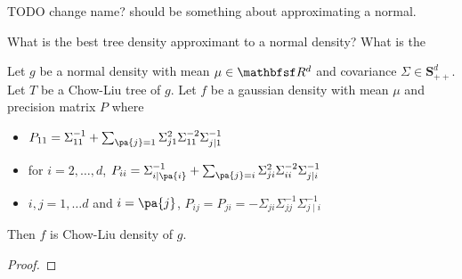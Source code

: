 
















\sstart
{}

TODO change name?
should be something about approximating a normal.

What is the best tree density approximant to a normal density?
What is the


\begin{prop}


Let $g$ be a normal density with mean $\mu \in \R^d$ and covariance $\Sigma \in \mathbf{S}^d_{++}$.
Let $T$ be a Chow-Liu tree of $g$.
Let $f$ be a gaussian density with mean $\mu$ and precision matrix $P$ where
  \begin{itemize}
    \item $P_{11} = \Sigma_{11}^{-1} + \sum_{\pa{j} = 1}
\Sigma_{j1}^2\Sigma_{11}^{-2}\Sigma_{j\mid 1}^{-1}$
      \item for $i = 2, \dots, d$, $P_{ii} = \Sigma_{i\mid\pa{i}}^{-1} + \sum_{\pa{j} = i} \Sigma_{ji}^2\Sigma_{ii}^{-2}\Sigma_{j\mid i}^{-1}$
      \item $i, j = 1, \dots d$ and $i = \pa{j}$, $P_{ij} = P_{ji} = -\Sigma_{ji}\Sigma_{jj}^{-1}\Sigma_{j \mid i}^{-1}$
  \end{itemize}
  Then $f$ is Chow-Liu density of $g$.

\begin{proof}

\end{proof}

\end{prop}
\strats

